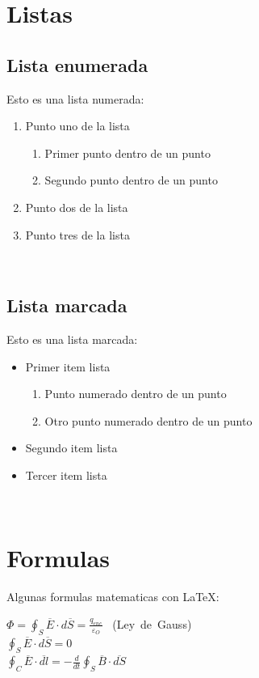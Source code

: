 \documentclass[10pt,a4paper]{report}
\begin{document}
\chapter*{Listas}

\section{Lista enumerada \cite{Terron}}

Esto es una lista numerada:
\begin{enumerate}
\item Punto uno de la lista
\begin{enumerate}
\item Primer punto dentro de un punto
\item Segundo punto dentro de un punto
\end{enumerate}
\item Punto dos de la lista
\item Punto tres de la lista
\end{enumerate}
\ \\

\section{Lista marcada \cite{Ibanez}}

Esto es una lista marcada:
\begin{itemize}
\item Primer item lista
\begin{enumerate}
\item Punto numerado dentro de un punto
\item Otro punto numerado dentro de un punto
\end{enumerate}
\item Segundo item lista
\item Tercer item lista
\end{itemize}\ \\


\chapter*{Formulas}

Algunas formulas matematicas con \LaTeX :\ \\

\begin{center}
$\Phi=\oint_{S}\overline{E}\cdot d\overline{S}=\frac{q_{enc}}{\varepsilon_{O}}$ \ (Ley\ de\ Gauss)\newline
\\[0.8cm]
$\oint_{S}\overline{E}\cdot d\overline{S}=0$\newline
\\[0.8cm]
$\oint_{C}\overline{E}\cdot\overline{dl}=-\frac{d}{dt}\oint_{S}\overline{B}\cdot\overline{dS}$\newline
\\[1cm]
\end{center}
\end{document}
